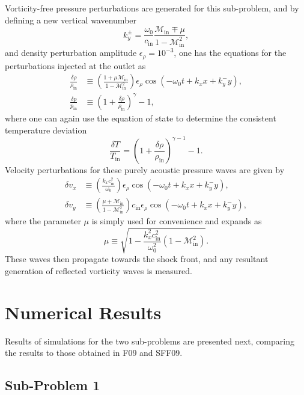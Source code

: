 Vorticity-free pressure perturbations are generated for this sub-problem, and by defining a new vertical wavenumber
\begin{equation}
k_y^\pm=\frac{\omega_0}{c_\textrm{in}}\frac{\mathcal{M}_\textrm{in}\mp\mu}{1-\mathcal{M}_\textrm{in}^2},
\end{equation}
and density perturbation amplitude $\epsilon_\rho=10^{-3}$, one has the equations for the perturbations injected at the outlet as
\begin{align}
\frac{\delta\rho}{\rho_\textrm{in}}&\equiv\left(\frac{1+\mu\mathcal{M}_\textrm{in}}{1-\mathcal{M}_\textrm{in}^2}\right)\epsilon_\rho\cos\left(-\omega_0t+k_xx+k_y^-y\right), \\
\frac{\delta p}{p_\textrm{in}}&\equiv\left(1+\frac{\delta\rho}{\rho_\textrm{in}}\right)^\gamma-1,
\end{align}
where one can again use the equation of state to determine the consistent temperature deviation
\begin{equation}
\frac{\delta T}{T_\textrm{in}}=\left(1+\frac{\delta\rho}{\rho_\textrm{in}}\right)^{\gamma-1}-1.
\end{equation}
Velocity perturbations for these purely acoustic pressure waves are given by
\begin{align}
\delta v_x&\equiv\left(\frac{k_xc_\textrm{in}^2}{\omega_0}\right)\epsilon_\rho\cos\left(-\omega_0t+k_xx+k_y^-y\right), \\
\delta v_y&\equiv\left(\frac{\mu+\mathcal{M}_\textrm{in}}{1-\mathcal{M}_\textrm{in}^2}\right)c_\textrm{in}\epsilon_\rho\cos\left(-\omega_0t+k_xx+k_y^-y\right),
\end{align}
where the parameter $\mu$ is simply used for convenience and expands as
\begin{equation}
\mu\equiv\sqrt{1-\frac{k_x^2c_\textrm{in}^2}{\omega_0^2}\left(1-\mathcal{M}_\textrm{in}^2\right)}.
\end{equation}
These waves then propagate towards the shock front, and any resultant generation of reflected vorticity waves is measured.


\section{Numerical Results}
\label{sec:TP_results}

Results of simulations for the two sub-problems are presented next, comparing the results to those obtained in F09 and SFF09.

\subsection{Sub-Problem 1}
\label{subsec:results_TP1}


